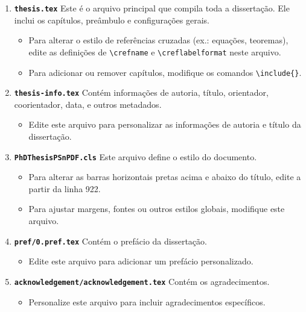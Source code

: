 \documentclass[a4paper,12pt]{article}
\begin{document}
\begin{enumerate}
    \item \textbf{\texttt{thesis.tex}}  
    Este é o arquivo principal que compila toda a dissertação. Ele inclui os capítulos, preâmbulo e configurações gerais.  
    \begin{itemize}
        \item Para alterar o estilo de referências cruzadas (ex.: equações, teoremas), edite as definições de \texttt{\textbackslash crefname} e \texttt{\textbackslash creflabelformat} neste arquivo.
        \item Para adicionar ou remover capítulos, modifique os comandos \texttt{\textbackslash include\{\}}.
    \end{itemize}

    \item \textbf{\texttt{thesis-info.tex}}  
    Contém informações de autoria, título, orientador, coorientador, data, e outros metadados.  
    \begin{itemize}
        \item Edite este arquivo para personalizar as informações de autoria e título da dissertação.
    \end{itemize}

    \item \textbf{\texttt{PhDThesisPSnPDF.cls}}  
    Este arquivo define o estilo do documento.  
    \begin{itemize}
        \item Para alterar as barras horizontais pretas acima e abaixo do título, edite a partir da linha 922.
        \item Para ajustar margens, fontes ou outros estilos globais, modifique este arquivo.
    \end{itemize}

    \item \textbf{\texttt{pref/0.pref.tex}}  
    Contém o prefácio da dissertação.  
    \begin{itemize}
        \item Edite este arquivo para adicionar um prefácio personalizado.
    \end{itemize}

    \item \textbf{\texttt{acknowledgement/acknowledgement.tex}}  
    Contém os agradecimentos.  
    \begin{itemize}
        \item Personalize este arquivo para incluir agradecimentos específicos.
    \end{itemize}


\end{enumerate}
\end{document}
